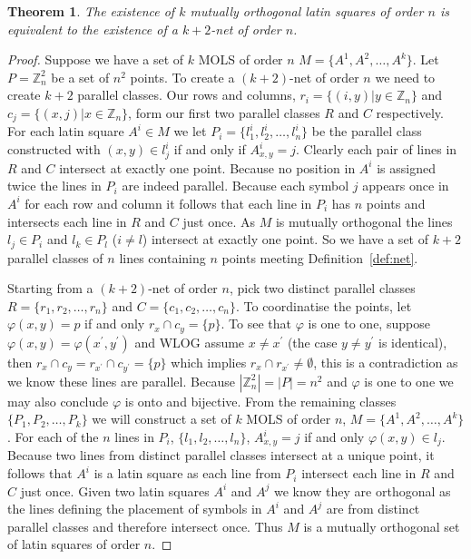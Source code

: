 \documentclass{article}
\newtheorem{theorem}{Theorem}
\begin{document}
\begin{theorem}\label{thm:mols-to-net}
  The existence of \(k\) mutually orthogonal latin squares of order \(n\) is equivalent to the existence of a \(k + 2\)-net of order \(n\).
\end{theorem}
\begin{proof}

  Suppose we have a set of \(k\) MOLS of order \(n\) \(M = \{A^{1}, A^{2}, \ldots, A^{k}\}\).
  Let \(P = \mathbb{Z}_{n}^{2}\) be a set of \(n^{2}\) points. To create a \((k + 2)\)-net of order \(n\) we need to create \(k + 2\) parallel classes.
  Our rows and columns, \(r_{i} = \{(i, y) | y \in \mathbb{Z}_{n}\}\)  and \(c_{j} = \{(x, j) | x \in \mathbb{Z}_{n}\}\), form our first two parallel classes \(R\) and \(C\) respectively.
  For each latin square \(A^{i} \in M\) we let \(P_{i} = \{l_{1}^{i}, l_{2}^{i}, \ldots, l_{n}^{i}\}\) be the parallel class constructed with \((x, y) \in l_{j}^{i}\) if and only if \(A^{i}_{x, y} = j\). Clearly each pair of lines in \(R\) and \(C\) intersect at exactly one point.
  Because no position in \(A^{i}\) is assigned twice the lines in \(P_{i}\) are indeed parallel.
  Because each symbol \(j\) appears once in \(A^{i}\) for each row and column it follows that each line in \(P_{i}\) has \(n\) points and intersects each line in \(R\) and \(C\) just once. As \(M\) is mutually orthogonal the lines \(l_{j} \in P_{i}\) and \(l_{k} \in P_{l}\) (\(i \neq l\)) intersect at exactly one point.
  So we have a set of \(k + 2\) parallel classes of \(n\) lines containing \(n\) points meeting Definition~\ref{def:net}.

  Starting from a \((k + 2)\)-net of order \(n\), pick two distinct parallel classes \(R = \{r_{1}, r_{2}, \ldots, r_{n}\}\) and \(C = \{c_{1}, c_{2}, \ldots, c_{n}\}\). To coordinatise the points, let \(\varphi(x, y) = p\) if and only \(r_{x} \cap c_{y} = \{p\}\). To see that \(\varphi\) is one to one, suppose \(\varphi(x, y) = \varphi(x^{\prime}, y^{\prime})\)
  and WLOG assume \(x \neq x^{\prime}\) (the case \(y \neq y^{\prime}\) is identical), then \(r_{x} \cap c_{y} = r_{x^{\prime}} \cap c_{y^{\prime}} = \{p\}\) which implies \(r_{x} \cap r_{x^{\prime}} \neq \emptyset\), this is a contradiction as we know these lines are parallel. Because \(|\mathbb{Z}_{n}^{2}| = |P| = n^{2}\) and \(\varphi\) is one to one we may also conclude \(\varphi\) is onto and bijective.
  From the remaining classes \(\{P_{1}, P_{2}, \ldots, P_{k}\}\) we will construct a set of \(k\) MOLS of order \(n\), \(M = \{A^{1}, A^{2}, \ldots, A^{k}\}\).
  For each of the \(n\) lines in \(P_{i}\), \(\{l_{1}, l_{2}, \ldots, l_{n}\}\), \(A^{i}_{x,y} = j\) if and only \(\varphi(x, y) \in l_{j}\). Because two lines from distinct parallel classes intersect at a unique point,
  it follows that \(A^{i}\) is a latin square as each line from \(P_{i}\) intersect each line in \(R\) and \(C\) just once. Given two latin squares \(A^{i}\) and \(A^{j}\) we know they are orthogonal as the lines defining the placement of symbols in \(A^{i}\) and \(A^{j}\) are from distinct parallel classes
  and therefore intersect once. Thus \(M\) is a mutually orthogonal set of latin squares of order \(n\).
\end{proof}
\end{document}
